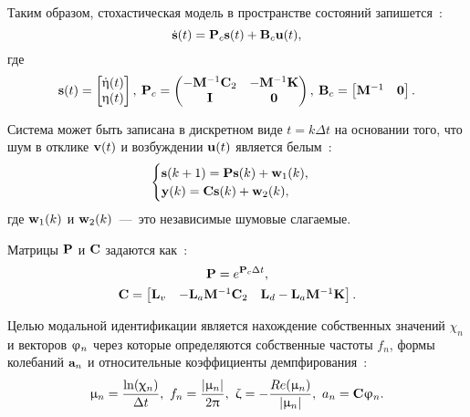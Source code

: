 Таким образом, стохастическая модель в пространстве состояний запишется~\cite{lib:oma:Juang}:
\begin{equation}
	\dot{\mathbf{s}}(t) = \mathbf{P}_c \mathbf{s}(t) + \mathbf{B}_c \mathbf{u}(t), \label{eq:stochasticModelSSI}
\end{equation}
где 
\begin{equation}
	\begin{gathered}
		\mathbf{s}(t) = 
		\begin{bmatrix} 
			\dot{\mathbf{\upeta}}(t) \\ 
			\mathbf{\upeta}(t) 
		\end{bmatrix}, \:
		\mathbf{P}_c =
		\begin{pmatrix}
			-\mathbf{M} ^ {-1} \mathbf{C}_2 & -\mathbf{M} ^ {-1} \mathbf{K} \\
			 \mathbf{I} & \mathbf{0}
		\end{pmatrix}, \:
		\mathbf{B}_c = 
		\begin{bmatrix}
			\mathbf{M} ^ {-1} &
			\mathbf{0}	
		\end{bmatrix}.
	\end{gathered}
\end{equation}

Система может быть записана в дискретном виде $ t = k \Delta t $ на основании того, что шум в отклике $ \mathbf{v}(t) $ и возбуждении $ \mathbf{u}(t) $ является белым~\cite{lib:oma:Nilsson}:
\begin{equation}
	\begin{cases}
		\mathbf{s}(k + 1) = \mathbf{P} \mathbf{s}(k) + \mathbf{w}_1(k), \\
		\mathbf{y}(k) = \mathbf{C} \mathbf{s}(k) + \mathbf{w}_2(k),
	\end{cases}
\end{equation}
где $ \mathbf{w}_1(k) $ и $ \mathbf{w}_2(k) $~---~это независимые шумовые слагаемые. 

Матрицы $ \mathbf{P} $ и $ \mathbf{C} $ задаются как~\cite{lib:oma:Nilsson}:
\begin{equation}
	\begin{gathered}
		\mathbf{P} = e ^ {\mathbf{P}_c \Delta t}, \\
		\mathbf{C} = 
		\begin{bmatrix} 
			\mathbf{L}_v & -\mathbf{L}_a \mathbf{M} ^ {-1} \mathbf{C}_2 & \mathbf{L}_d - \mathbf{L}_a \mathbf{M} ^ {-1} \mathbf{K}
		\end{bmatrix}.
	\end{gathered}
\end{equation}

Целью модальной идентификации является нахождение собственных значений $ \chi_n $ и векторов $ \mathbf{\upvarphi}_n $ через которые определяются собственные частоты $ f_n $, формы колебаний $ \mathbf{a}_n $ и относительные коэффициенты демпфирования~\cite{lib:oma:Nilsson}:
\begin{equation}
	\upmu_n = \frac{\ln(\upchi_n)}{\Delta t}, \ f_n = \frac{|\upmu_n|}{2 \uppi}, \ \upzeta = -\frac{Re(\upmu_n)}{|\upmu_n|}, \ a_n = \mathbf{C} \mathbf{\upvarphi}_n.
\end{equation}

